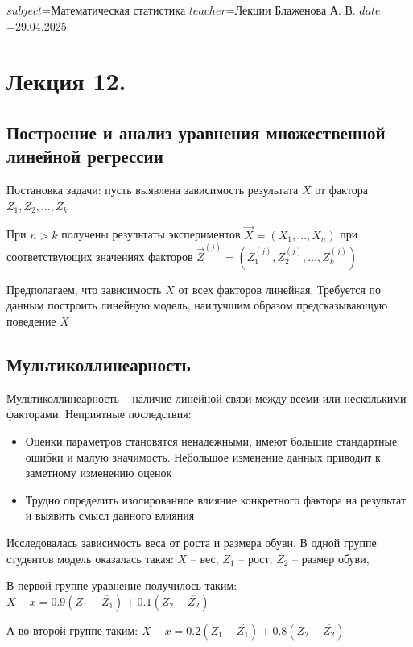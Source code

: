 $subject$=Математическая статистика
$teacher$=Лекции Блаженова А. В.
$date$=29.04.2025

\section{Лекция 12.}

\subsection{Построение и анализ уравнения множественной линейной регрессии}

Постановка задачи: пусть выявлена зависимость результата $X$ от фактора $Z_1, Z_2, \dots, Z_k$

При $n > k$ получены результаты экспериментов $\vec X = (X_1, \dots, X_n)$ при соответствующих значениях факторов $\vec Z^{(j)} = (Z^{(j)}_1, Z^{(j)}_2, \dots, Z^{(j)}_k)$

Предполагаем, что зависимость $X$ от всех факторов линейная. Требуется по данным построить линейную модель, наилучшим образом предсказывающую поведение $X$

\subsection{Мультиколлинеарность}

\hypertarget{multicollinearity}{}

\Def Мультиколлинеарность -- наличие линейной связи между всеми или несколькими факторами. Неприятные последствия:

\begin{itemize}
    \item Оценки параметров становятся ненадежными, имеют большие стандартные ошибки и малую значимость.
    Небольшое изменение данных приводит к заметному изменению оценок
    \item Трудно определить изолированное влияние конкретного фактора на результат и выявить смысл данного влияния
\end{itemize}

\Ex Исследовалась зависимость веса от роста и размера обуви. В одной группе студентов модель оказалась такая: 
$X$ -- вес, $Z_1$ -- рост, $Z_2$ -- размер обуви, 

В первой группе уравнение получилось таким: $X - \overline{x} = 0.9(Z_1 - \overline{Z_1}) + 0.1(Z_2 - \overline{Z_2})$

А во второй группе таким: $X - \overline{x} = 0.2(Z_1 - \overline{Z_1}) + 0.8(Z_2 - \overline{Z_2})$

